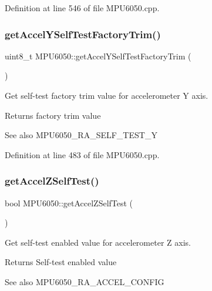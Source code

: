 Definition at line 546 of file M\+P\+U6050.\+cpp.

\mbox{\label{classMPU6050_ae219dc9651d4d42a918e553b03e4e7bf}} 
\subsubsection{\texorpdfstring{getAccelYSelfTestFactoryTrim()}{getAccelYSelfTestFactoryTrim()}}
{\footnotesize\ttfamily uint8\+\_\+t M\+P\+U6050\+::get\+Accel\+Y\+Self\+Test\+Factory\+Trim (\begin{DoxyParamCaption}{ }\end{DoxyParamCaption})}



Get self-\/test factory trim value for accelerometer Y axis. 

\begin{DoxyReturn}{Returns}
factory trim value 
\end{DoxyReturn}
\begin{DoxySeeAlso}{See also}
M\+P\+U6050\+\_\+\+R\+A\+\_\+\+S\+E\+L\+F\+\_\+\+T\+E\+S\+T\+\_\+Y 
\end{DoxySeeAlso}


Definition at line 483 of file M\+P\+U6050.\+cpp.

\mbox{\label{classMPU6050_a57710638eeb6176cf14a8c444bda5300}} 
\subsubsection{\texorpdfstring{getAccelZSelfTest()}{getAccelZSelfTest()}}
{\footnotesize\ttfamily bool M\+P\+U6050\+::get\+Accel\+Z\+Self\+Test (\begin{DoxyParamCaption}{ }\end{DoxyParamCaption})}



Get self-\/test enabled value for accelerometer Z axis. 

\begin{DoxyReturn}{Returns}
Self-\/test enabled value 
\end{DoxyReturn}
\begin{DoxySeeAlso}{See also}
M\+P\+U6050\+\_\+\+R\+A\+\_\+\+A\+C\+C\+E\+L\+\_\+\+C\+O\+N\+F\+IG 
\end{DoxySeeAlso}


